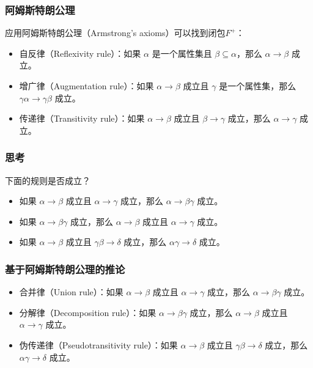 \documentclass[aspectratio=169, 14pt]{beamer}
\begin{document}
\begin{frame}
  \frametitle{阿姆斯特朗公理}
  应用\alert{阿姆斯特朗公理（Armstrong's axioms）}可以找到闭包$F^+$：
  \begin{itemize}
    \item \alert{自反律}（Reflexivity rule）：如果 $\alpha$ 是一个属性集且 $\beta \subseteq \alpha$，那么 $\alpha \rightarrow \beta$ 成立。
    \item \alert{增广律}（Augmentation rule）：如果 $\alpha \rightarrow \beta$ 成立且 $\gamma$ 是一个属性集，那么 $\gamma\alpha \rightarrow \gamma\beta$ 成立。
    \item \alert{传递律}（Transitivity rule）：如果 $\alpha \rightarrow \beta$ 成立且 $\beta \rightarrow \gamma$ 成立，那么 $\alpha \rightarrow \gamma$ 成立。
\end{itemize}
\end{frame}

\begin{frame}
  \frametitle{思考}
下面的规则是否成立？

\begin{itemize}
\item 如果 $\alpha \rightarrow \beta$ 成立且 $\alpha \rightarrow \gamma$ 成立，那么 $\alpha \rightarrow \beta\gamma$ 成立。
\item 如果 $\alpha \rightarrow \beta\gamma$ 成立，那么 $\alpha \rightarrow \beta$ 成立且 $\alpha \rightarrow \gamma$ 成立。
\item 如果 $\alpha \rightarrow \beta$ 成立且 $\gamma\beta \rightarrow \delta$ 成立，那么 $\alpha\gamma \rightarrow \delta$ 成立。
\end{itemize}
\end{frame}


\begin{frame}
  \frametitle{基于阿姆斯特朗公理的推论}

\begin{itemize}
  \item \alert{合并律}（Union rule）：如果 $\alpha \rightarrow \beta$ 成立且 $\alpha \rightarrow \gamma$ 成立，那么 $\alpha \rightarrow \beta\gamma$ 成立。
  \item \alert{分解律}（Decomposition rule）：如果 $\alpha \rightarrow \beta\gamma$ 成立，那么 $\alpha \rightarrow \beta$ 成立且 $\alpha \rightarrow \gamma$ 成立。
  \item \alert{伪传递律}（Pseudotransitivity rule）：如果 $\alpha \rightarrow \beta$ 成立且 $\gamma\beta \rightarrow \delta$ 成立，那么 $\alpha\gamma \rightarrow \delta$ 成立。
\end{itemize}
\end{frame}
\end{document}
